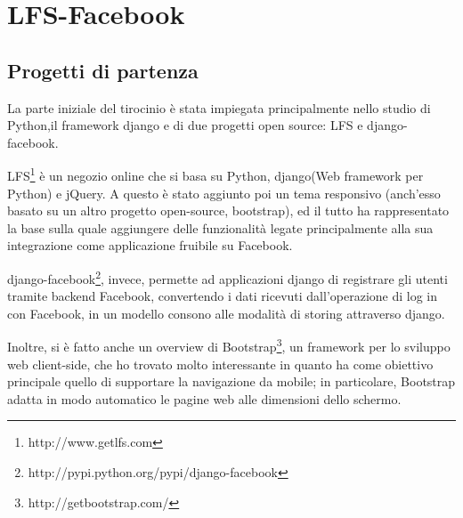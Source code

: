 \chapter{LFS-Facebook}
\section{Progetti di partenza}
La parte iniziale del tirocinio è stata impiegata principalmente nello studio di Python,il framework django e di due progetti open source: LFS e django-facebook.

\vspace{2.5 mm}
LFS\footnote{http://www.getlfs.com} è un negozio online che  si basa su Python, django(Web framework per Python) e jQuery. A questo è stato aggiunto poi un tema responsivo (anch'esso basato su un altro progetto open-source, bootstrap), ed il tutto ha rappresentato la base sulla quale aggiungere delle funzionalità legate principalmente alla sua integrazione come applicazione fruibile su Facebook. 

\vspace{2.5 mm}
django-facebook\footnote{http://pypi.python.org/pypi/django-facebook}, invece, permette ad applicazioni django di registrare gli utenti tramite backend Facebook, convertendo i dati ricevuti dall'operazione di log in con Facebook, in un modello consono alle modalità di storing attraverso django.

\vspace{2.5 mm}
Inoltre, si è fatto anche un overview di Bootstrap\footnote{http://getbootstrap.com/}, un framework per lo sviluppo web client-side, che ho trovato molto interessante in quanto ha come obiettivo principale quello di supportare la navigazione da mobile; in particolare, Bootstrap adatta in modo automatico le pagine web alle dimensioni dello schermo. 
\newpage

